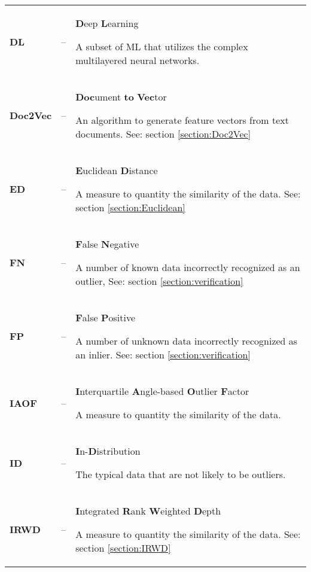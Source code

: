 {\begin{longtable}{>{\bfseries}l l p{}}
        DL
        &–&
        \textbf{D}eep \textbf{L}earning
        \par
        \small
        A subset of ML that utilizes the complex multilayered neural networks.
        \\

        Doc2Vec
        &–&
        \textbf{Doc}ument \textbf{to} \textbf{Vec}tor
        \par
        \small
        An algorithm to generate feature vectors from text documents.
        \newline
        See: section \ref{section:Doc2Vec}
        \\

        ED
        &–&
        \textbf{E}uclidean \textbf{D}istance
        \par
        \small
        A measure to quantity the similarity of the data.
        \newline
        See: section \ref{section:Euclidean}
        \\

        FN
        &–&
        \textbf{F}alse \textbf{N}egative
        \par
        \small
        A number of known data incorrectly recognized as an outlier,
        \newline
        See: section \ref{section:verification}
        \\

        FP
        &–&
        \textbf{F}alse \textbf{P}ositive
        \par
        \small
        A number of unknown data incorrectly recognized as an inlier.
        \newline
        See: section \ref{section:verification}
        \\

        IAOF
        &–&
        \textbf{I}nterquartile \textbf{A}ngle-based \textbf{O}utlier \textbf{F}actor
        \par
        \small
        A measure to quantity the similarity of the data.
        \\

        ID
        &–&
        \textbf{I}n-\textbf{D}istribution
        \par
        \small
        The typical data that are not likely to be outliers.
        \\

        IRWD
        &–&
        \textbf{I}ntegrated \textbf{R}ank \textbf{W}eighted \textbf{D}epth
        \par
        \small
        A measure to quantity the similarity of the data.
        \newline
        See: section \ref{section:IRWD}
        \\


\end{longtable}}
